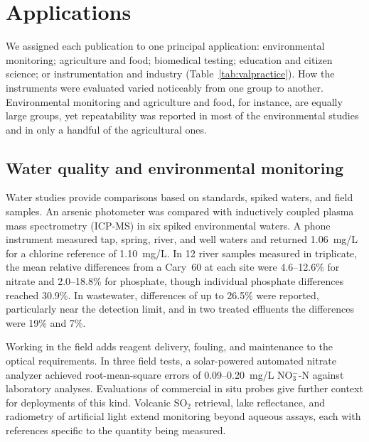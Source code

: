 \section{Applications}\label{sec:applications}

We assigned each publication to one principal application: environmental monitoring; agriculture and food; biomedical testing; education and citizen science; or instrumentation and industry (Table~\ref{tab:valpractice}). How the instruments were evaluated varied noticeably from one group to another. Environmental monitoring and agriculture and food, for instance, are equally large groups, yet repeatability was reported in most of the environmental studies and in only a handful of the agricultural ones.

\subsection{Water quality and environmental monitoring}

Water studies provide comparisons based on standards, spiked waters, and field samples. An arsenic photometer was compared with inductively coupled plasma mass spectrometry (ICP-MS) in six spiked environmental waters.\citep{awasthi2023portable} A phone instrument measured tap, spring, river, and well waters and returned 1.06~mg/L for a chlorine reference of 1.10~mg/L.\citep{sargazi2020application} In 12 river samples measured in triplicate, the mean relative differences from a Cary~60 at each site were 4.6--12.6\% for nitrate and 2.0--18.8\% for phosphate, though individual phosphate differences reached 30.9\%.\citep{cirrone2025low} In wastewater, differences of up to 26.5\% were reported, particularly near the detection limit,\citep{silva2022smartphone} and in two treated effluents the differences were 19\% and 7\%.\citep{booysen2021water}

Working in the field adds reagent delivery, fouling, and maintenance to the optical requirements. In three field tests, a solar-powered automated nitrate analyzer achieved root-mean-square errors of 0.09--0.20~mg/L NO$_3^-$-N against laboratory analyses.\citep{bulusu2024technical} Evaluations of commercial in situ probes give further context for deployments of this kind.\citep{zhu2021assessment} Volcanic SO$_2$ retrieval,\citep{wilkes2017low,wilkes2019pispec} lake reflectance,\citep{jechow2024characterizing} and radiometry of artificial light\citep{troscianko2023osprad} extend monitoring beyond aqueous assays, each with references specific to the quantity being measured.

